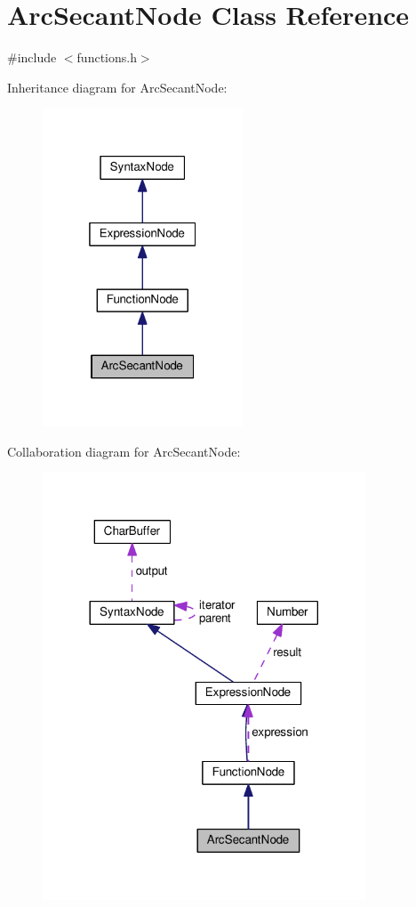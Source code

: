 \hypertarget{classArcSecantNode}{}\section{Arc\+Secant\+Node Class Reference}
\label{classArcSecantNode}


{\ttfamily \#include $<$functions.\+h$>$}



Inheritance diagram for Arc\+Secant\+Node\+:
\nopagebreak
\begin{figure}[H]
\begin{center}
\leavevmode
\includegraphics[width=169pt]{da/d77/classArcSecantNode__inherit__graph}
\end{center}
\end{figure}


Collaboration diagram for Arc\+Secant\+Node\+:
\nopagebreak
\begin{figure}[H]
\begin{center}
\leavevmode
\includegraphics[width=272pt]{de/dd1/classArcSecantNode__coll__graph}
\end{center}
\end{figure}
